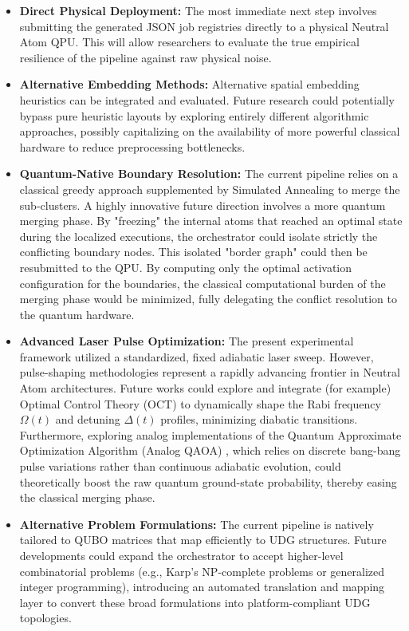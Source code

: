 \begin{itemize}
    \item \textbf{Direct Physical Deployment:} The most immediate next step involves submitting the generated JSON job registries directly to a physical Neutral Atom QPU. This will allow researchers to evaluate the true empirical resilience of the pipeline against raw physical noise.
    
    \item \textbf{Alternative Embedding Methods:} Alternative spatial embedding heuristics can be integrated and evaluated. Future research could potentially bypass pure heuristic layouts by exploring entirely different algorithmic approaches, possibly capitalizing on the availability of more powerful classical hardware to reduce preprocessing bottlenecks.    
    
    \item \textbf{Quantum-Native Boundary Resolution:} The current pipeline relies on a classical greedy approach supplemented by Simulated Annealing to merge the sub-clusters. A highly innovative future direction involves a more quantum merging phase. By "freezing" the internal atoms that reached an optimal state during the localized executions, the orchestrator could isolate strictly the conflicting boundary nodes. This isolated "border graph" could then be resubmitted to the QPU. By computing only the optimal activation configuration for the boundaries, the classical computational burden of the merging phase would be minimized, fully delegating the conflict resolution to the quantum hardware.
    
    \item \textbf{Advanced Laser Pulse Optimization:} The present experimental framework utilized a standardized, fixed adiabatic laser sweep. However, pulse-shaping methodologies represent a rapidly advancing frontier in Neutral Atom architectures. Future works could explore and integrate (for example) Optimal Control Theory (OCT) \cite{glaser2015training} to dynamically shape the Rabi frequency $\Omega(t)$ and detuning $\Delta(t)$ profiles, minimizing diabatic transitions. Furthermore, exploring analog implementations of the Quantum Approximate Optimization Algorithm (Analog QAOA) \cite{pichler2018quantum}, which relies on discrete bang-bang pulse variations rather than continuous adiabatic evolution, could theoretically boost the raw quantum ground-state probability, thereby easing the classical merging phase.
    
    \item \textbf{Alternative Problem Formulations:} The current pipeline is natively tailored to QUBO matrices that map efficiently to UDG structures. Future developments could expand the orchestrator to accept higher-level combinatorial problems (e.g., Karp's NP-complete problems or generalized integer programming), introducing an automated translation and mapping layer to convert these broad formulations into platform-compliant UDG topologies.
\end{itemize}

